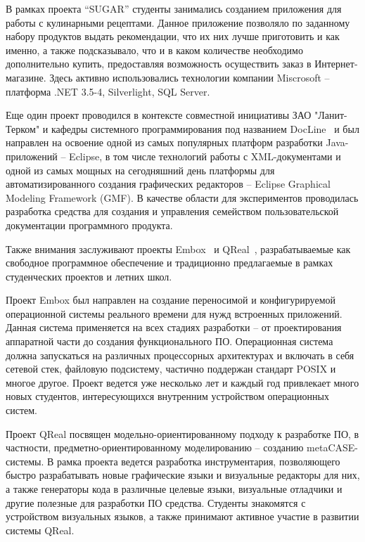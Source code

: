 \documentclass[a5paper]{article}
\begin{document}
В рамках проекта ``SUGAR'' студенты занимались созданием приложения для работы с кулинарными рецептами. Данное приложение позволяло по заданному набору продуктов выдать рекомендации, что их них лучше приготовить и как именно, а также подсказывало, что и в каком количестве необходимо дополнительно купить, предоставляя возможность осуществить заказ в Интернет-магазине. Здесь активно использовались технологии компании Miscrosoft -- платформа .NET 3.5-4, Silverlight, SQL Server.

Еще один проект проводился в контексте совместной инициативы ЗАО "Ланит-Терком" и кафедры системного программирования под названием DocLine~\cite{docLine1, docLine3, docLine2} и был направлен на освоение одной из самых популярных платформ разработки Java-приложений -- Eclipse, в том числе технологий работы с XML-документами и одной из самых мощных на сегодняшний день платформы для автоматизированного создания графических редакторов -- Eclipse Graphical Modeling Framework (GMF). В качестве области для экспериментов проводилась разработка средства для создания и управления семейством пользовательской документации программного продукта. 
 
Также внимания заслуживают проекты Embox~\cite{embox} и QReal~\cite{qreal2, qreal3, qreal}, разрабатываемые как свободное программное обеспечение и традиционно предлагаемые в рамках студенческих проектов и летних школ. 

Проект Embox был направлен на создание переносимой  и конфигурируемой операционной системы реального времени для нужд встроенных приложений. Данная система применяется на всех стадиях разработки -- от проектирования аппаратной части до создания функционального ПО. Операционная система  должна запускаться на различных процессорных архитектурах и включать в себя сетевой стек, файловую подсистему, частично поддержан стандарт POSIX и многое другое. Проект ведется уже несколько лет и каждый год привлекает много новых студентов, интересующихся внутренним устройством операционных систем.  

Проект QReal посвящен модельно-ориентированному подходу к разработке ПО, в частности, предметно-ориентированному моделированию -- созданию metaCASE-системы. В рамка проекта ведется разработка инструментария, позволяющего быстро разрабатывать новые графические языки и визуальные редакторы для них, а также генераторы кода в различные целевые языки, визуальные отладчики и другие полезные для разработки ПО средства. Студенты знакомятся с устройством визуальных языков, а также принимают активное участие в развитии системы QReal.
\end{document}
